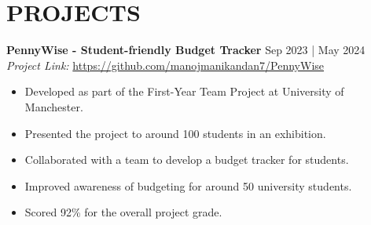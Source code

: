 \documentclass[a4paper,1.5pt]{extarticle}
\begin{document}

\section*{PROJECTS}
\noindent
\textbf{PennyWise - Student-friendly Budget Tracker} \hfill Sep 2023 | May 2024 \\ %
\textit{Project Link:} \url{https://github.com/manojmanikandan7/PennyWise}
\begin{itemize}
    \item Developed as part of the First-Year Team Project at University of Manchester.
    \item Presented the project to around 100 students in an exhibition.
    \item Collaborated with a team to develop a budget tracker for students.
    \item Improved awareness of budgeting for around 50 university students.
    \item Scored 92\% for the overall project grade.
\end{itemize}

\end{document}
